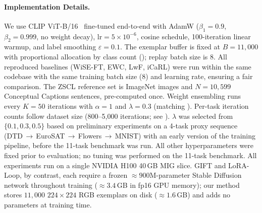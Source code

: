 \documentclass{article}
\let\cite\citep
\begin{document}
 \paragraph{Implementation Details.}
  We use CLIP ViT-B/16~\cite{radford2021clip} fine-tuned end-to-end with AdamW
  ($\beta_1{=}0.9$, $\beta_2{=}0.999$, no weight decay),
  $\text{lr}{=}5\!\times\!10^{-6}$, cosine schedule, 100-iteration linear warmup,
  and label smoothing $\varepsilon{=}0.1$. The exemplar buffer is fixed at
  $B{=}11{,}000$ with proportional allocation by class count
(); replay batch size is 8. All reproduced baselines (WiSE-FT, EWC, LwF, iCaRL) were run within the same codebase with the same training batch size (8) and learning
  rate, ensuring a fair comparison. The ZSCL reference set is ImageNet images and $N{=}10{,}599$ Conceptual Captions sentences, pre-computed once. Weight ensembling runs every $K{=}50$
  iterations with $\alpha{=}1$ and $\lambda{=}0.3$ (matching ). Per-task iteration counts follow dataset size (800--5{,}000 iterations; see ). $\lambda$  
  was selected from $\{0.1, 0.3, 0.5\}$ based on preliminary experiments on a 4-task proxy sequence (DTD\,$\to$\,EuroSAT\,$\to$\,Flowers\,$\to$\,MNIST) with an early version of the training
  pipeline, before the 11-task benchmark was run. All other hyperparameters were fixed prior to evaluation; no tuning was performed on the 11-task benchmark. All experiments run on a single 
  NVIDIA H100 40\,GB MIG slice. GIFT and LoRA-Loop, by contrast, each require a frozen ${\approx}900$M-parameter Stable Diffusion network throughout training (${\approx}3.4$\,GB in fp16 GPU
  memory); our method stores $11{,}000$ $224{\times}224$ RGB exemplars on disk (${\approx}1.6$\,GB) and adds no parameters at training time.
\end{document}
